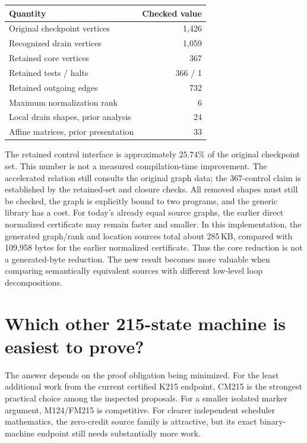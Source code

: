 \documentclass[11pt,letterpaper]{article}
\theoremstyle{definition}\newtheorem{definition}[theorem]{Definition}
\begin{document}
\begin{center}
\begin{tabular}{lr}
\toprule
Quantity & Checked value\\\midrule
Original checkpoint vertices & 1,426\\
Recognized drain vertices & 1,059\\
Retained core vertices & 367\\
Retained tests / halts & 366 / 1\\
Retained outgoing edges & 732\\
Maximum normalization rank & 6\\
Local drain shapes, prior analysis & 24\\
Affine matrices, prior presentation & 33\\
\bottomrule
\end{tabular}
\end{center}

The retained control interface is approximately $25.74\%$ of the original
checkpoint set. This number is not a measured compilation-time improvement.
The accelerated relation still consults the original graph data; the
367-control claim is established by the retained-set and closure checks.
All removed shapes must still be checked, the graph is explicitly bound to two
programs, and the generic library has a cost. For today's already equal source
graphs, the earlier direct normalized certificate may remain faster and smaller.
In this implementation, the generated graph/rank and location sources total
about 285\,KB, compared with 109,958 bytes for the earlier normalized
certificate. Thus the core reduction is not a generated-byte reduction.
The new result becomes more valuable when comparing semantically equivalent
sources with different low-level loop decompositions.

\section{Which other 215-state machine is easiest to prove?}

The answer depends on the proof obligation being minimized. For the least
additional work from the current certified K215 endpoint, CM215 is the strongest
practical choice among the inspected proposals. For a smaller isolated marker
argument, M124/FM215 is competitive. For clearer independent scheduler
mathematics, the zero-credit source family is attractive, but its exact
binary-machine endpoint still needs substantially more work.
\end{document}
